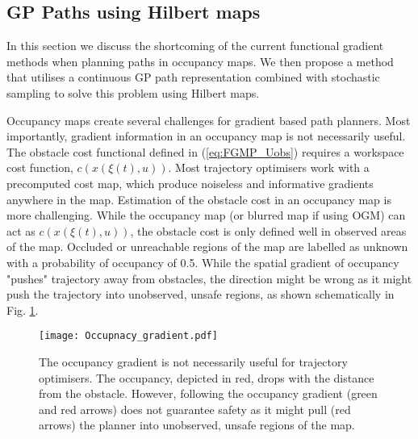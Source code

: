 \documentclass[letterpaper, 10 pt, conference]{ieeeconf}  %
\begin{document}
  
\subsection{GP Paths using Hilbert maps} \label{subsec:GPPaths}
In this section we discuss the shortcoming of the current functional gradient methods when planning paths in occupancy maps. We then propose a method that utilises a continuous GP path representation combined with stochastic sampling to solve this problem using Hilbert maps.

Occupancy maps create several challenges for gradient based path planners. Most importantly, gradient information in an occupancy map is not necessarily useful. The obstacle cost functional defined in (\ref{eq:FGMP_Uobs}) requires a workspace cost function, $c(x(\xi(t),u))$. Most trajectory optimisers work with a precomputed cost map, which produce noiseless and informative gradients anywhere in the map. Estimation of the obstacle cost in an occupancy map is more challenging. While the occupancy map (or blurred map if using OGM) can act as $c(x(\xi(t),u))$, the obstacle cost is only defined well in observed areas of the map. Occluded or unreachable regions of the map are labelled as unknown with a probability of occupancy of 0.5. While the spatial gradient of occupancy "pushes" trajectory away from obstacles, the direction might be wrong as it might push the trajectory into unobserved, unsafe regions, as shown schematically in Fig. \ref{fig:occupancy_grad}.  
\begin{figure}[thpb]
	\centering
	
	\texttt{[image: Occupnacy\_gradient.pdf]}
	
	\caption{The occupancy gradient is not necessarily useful for trajectory optimisers. The occupancy, depicted in red, drops with the distance from the obstacle. However, following the occupancy gradient (green and red arrows) does not guarantee safety as it might pull (red arrows) the planner into unobserved, unsafe regions of the map.}
	\label{fig:occupancy_grad}
\end{figure}
\end{document}
